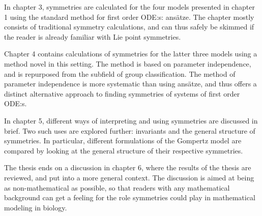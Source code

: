 In chapter 3, symmetries are calculated for the four models presented in chapter 1 using the standard method for first order ODE:s: ansätze.
The chapter mostly consists of traditional symmetry calculations, and can thus safely be skimmed if the reader is already familiar with Lie point symmetries.

Chapter 4 contains calculations of symmetries for the latter three models using a method novel in this setting.
The method is based on parameter independence, and is repurposed from the subfield of group classification.
The method of parameter independence is more systematic than using ansätze, and thus offers a distinct alternative approach to finding symmetries of systems of first order ODE:s.

In chapter 5, different ways of interpreting and using symmetries are discussed in brief.
Two such uses are explored further: invariants and the general structure of symmetries.
In particular, different formulations of the Gompertz model are compared by looking at the general structure of their respective symmetries.

The thesis ends on a discussion in chapter 6, where the results of the thesis are reviewed, and put into a more general context.
The discussion is aimed at being as non-mathematical as possible, so that readers with any mathematical background can get a feeling for the role symmetries could play in mathematical modeling in biology.
